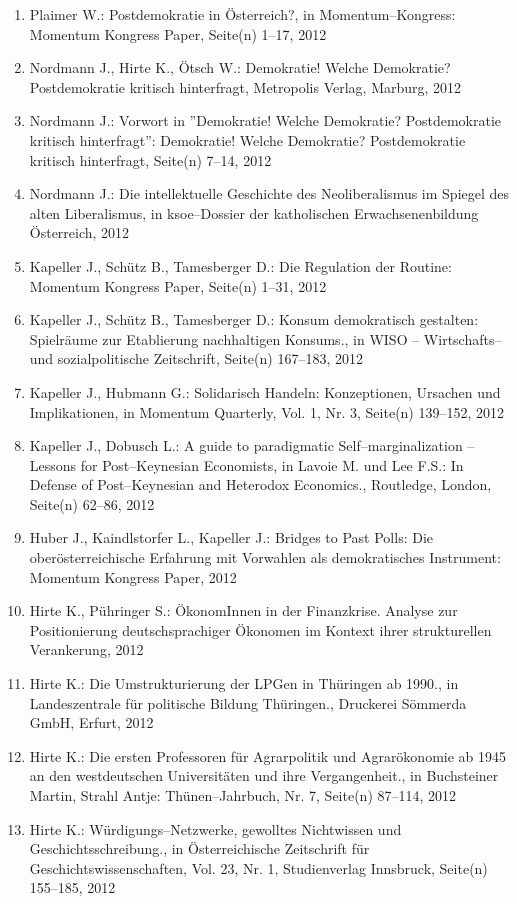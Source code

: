 \begin{enumerate}
	 \item Plaimer W.: Postdemokratie in Österreich?, in Momentum--Kongress: Momentum Kongress Paper, Seite(n) 1--17, 2012
	 \item Nordmann J., Hirte K., Ötsch W.: Demokratie! Welche Demokratie? Postdemokratie kritisch hinterfragt, Metropolis Verlag, Marburg, 2012
	 \item Nordmann J.: Vorwort in ''Demokratie! Welche Demokratie? Postdemokratie kritisch hinterfragt'': Demokratie! Welche Demokratie? Postdemokratie kritisch hinterfragt, Seite(n) 7--14, 2012
	 \item Nordmann J.: Die intellektuelle Geschichte des Neoliberalismus im Spiegel des alten Liberalismus, in ksoe--Dossier der katholischen Erwachsenenbildung Österreich, 2012
	 \item Kapeller J., Schütz B., Tamesberger D.: Die Regulation der Routine: Momentum Kongress Paper, Seite(n) 1--31, 2012
	 \item Kapeller J., Schütz B., Tamesberger D.: Konsum demokratisch gestalten: Spielräume zur Etablierung nachhaltigen Konsums., in WISO -- Wirtschafts-- und sozialpolitische Zeitschrift, Seite(n) 167--183, 2012
	 \item Kapeller J., Hubmann G.: Solidarisch Handeln: Konzeptionen, Ursachen und Implikationen, in Momentum Quarterly, Vol. 1, Nr. 3, Seite(n) 139--152, 2012
	 \item Kapeller J., Dobusch L.: A guide to paradigmatic Self--marginalization -- Lessons for Post--Keynesian Economists, in Lavoie M. und Lee F.S.: In Defense of Post--Keynesian and Heterodox Economics., Routledge, London, Seite(n) 62--86, 2012
	 \item Huber J., Kaindlstorfer L., Kapeller J.: Bridges to Past Polls: Die oberösterreichische Erfahrung mit Vorwahlen als demokratisches Instrument: Momentum Kongress Paper, 2012
	 \item Hirte K., Pühringer S.: ÖkonomInnen in der Finanzkrise. Analyse zur Positionierung deutschsprachiger Ökonomen im Kontext ihrer strukturellen Verankerung, 2012
	 \item Hirte K.: Die Umstrukturierung der LPGen in Thüringen ab 1990., in Landeszentrale für politische Bildung Thüringen., Druckerei Sömmerda GmbH, Erfurt, 2012
	 \item Hirte K.: Die ersten Professoren für Agrarpolitik und Agrarökonomie ab 1945 an den westdeutschen Universitäten und ihre Vergangenheit., in Buchsteiner Martin, Strahl Antje: Thünen--Jahrbuch, Nr. 7, Seite(n) 87--114, 2012
	 \item Hirte K.: Würdigungs--Netzwerke, gewolltes Nichtwissen und Geschichtsschreibung., in Österreichische Zeitschrift für Geschichtswissenschaften, Vol. 23, Nr. 1, Studienverlag Innsbruck, Seite(n) 155--185, 2012

\end{enumerate}
